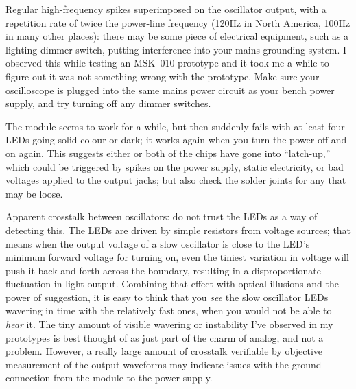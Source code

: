 Regular high-frequency spikes superimposed on the oscillator output, with a
repetition rate of twice the power-line frequency (120Hz in North America,
100Hz in many other places): there may be some piece of electrical
equipment, such as a lighting dimmer switch, putting interference into your
mains grounding system.  I observed this while testing an MSK~010 prototype
and it took me a while to figure out it was not something wrong with the
prototype.  Make sure your oscilloscope is plugged into the same mains power
circuit as your bench power supply, and try turning off any dimmer switches.

The module seems to work for a while, but then suddenly fails with at least
four LEDs going solid-colour or dark; it works again when you turn the
power off and on again.  This suggests either or both of the
chips have gone into ``latch-up,'' which could be triggered by spikes on
the power supply, static electricity, or bad voltages applied to the output
jacks; but also check the solder joints for any that may be loose.

Apparent crosstalk between oscillators:  do not trust the LEDs as a way of
detecting this.  The LEDs are driven by simple resistors from voltage
sources; that means when the output voltage of a slow oscillator is close to
the LED's minimum forward voltage for turning on, even the tiniest variation
in voltage will push it back and forth across the boundary, resulting in a
disproportionate fluctuation in light output.  Combining that effect with
optical illusions and the power of suggestion, it is easy to think that you
\emph{see} the slow oscillator LEDs wavering in time with the relatively
fast ones, when you would not be able to \emph{hear} it.  The tiny amount of
visible wavering or instability I've observed in my prototypes is best
thought of as just part of the charm of analog, and not a problem.  However,
a really large amount of crosstalk verifiable by objective measurement of
the output waveforms may indicate issues with the ground connection from
the module to the power supply.
